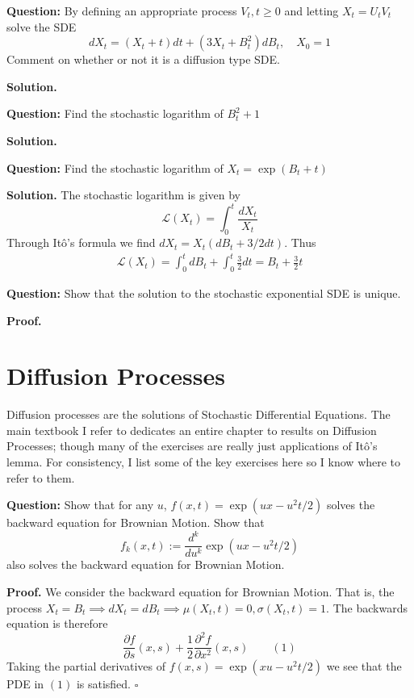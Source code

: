 \documentclass{article}
\begin{document}
\begin{tcolorbox}[colframe=black,colback=gray!5,boxrule=0.5pt]
\textbf{Question:} By defining an appropriate process $V_t, t\geq0$ and letting $X_t = U_tV_t$ solve the SDE
$$dX_t = (X_t+t)dt + (3X_t+B_t^2)dB_t, \quad X_0=1$$
Comment on whether or not it is a diffusion type SDE. 
\end{tcolorbox}
\textbf{Solution.}

\begin{tcolorbox}[colframe=black,colback=gray!5,boxrule=0.5pt]
\textbf{Question:} Find the stochastic logarithm of $B_t^2+1$
\end{tcolorbox}
\textbf{Solution.}

\begin{tcolorbox}[colframe=black,colback=gray!5,boxrule=0.5pt]
\textbf{Question:} Find the stochastic logarithm of $X_t = \exp(B_t + t)$
\end{tcolorbox}
\textbf{Solution.} The stochastic logarithm is given by 
$$\mathcal{L}(X_t) = \int_0^t \frac{dX_t}{X_t}$$
Through Itô's formula we find $dX_t = X_t(dB_t + 3/2dt)$. Thus 
\begin{align*}
    \mathcal{L}(X_t) = \int_0^tdB_t + \int_0^t\frac{3}{2}dt = B_t + \frac{3}{2}t
\end{align*}

\begin{tcolorbox}[colframe=black,colback=gray!5,boxrule=0.5pt]
\textbf{Question:} Show that the solution to the stochastic exponential SDE is unique.
\end{tcolorbox}
\textbf{Proof.}

\newpage
\section{Diffusion Processes}

Diffusion processes are the solutions of Stochastic Differential Equations. The main textbook I refer to \cite{Fima} dedicates an entire chapter to results on Diffusion Processes; though many of the exercises are really just applications of Itô's lemma. For consistency, I list some of the key exercises here so I know where to refer to them.

\begin{tcolorbox}[colframe=black,colback=gray!5,boxrule=0.5pt]
\textbf{Question:} Show that for any $u$, $f(x,t) = \exp(ux-u^2t/2)$ solves the backward equation for Brownian Motion. Show that 
$$f_k(x,t) := \frac{d^k}{du^k}\exp(ux-u^2t/2)$$
also solves the backward equation for Brownian Motion.
\end{tcolorbox}
\textbf{Proof.} We consider the backward equation for Brownian Motion. That is, the process $X_t = B_t\implies dX_t=dB_t\implies\mu(X_t,t)=0,\sigma(X_t,t)=1$. The backwards equation is therefore
$$\frac{\partial f}{\partial s}(x,s) + \frac{1}{2}\frac{\partial^2 f}{\partial x^2}(x,s) \quad\quad (1)$$
Taking the partial derivatives of $f(x,s) = \exp(xu - u^2t/2)$ we see that the PDE in $(1)$ is satisfied. $\square$
\end{document}
